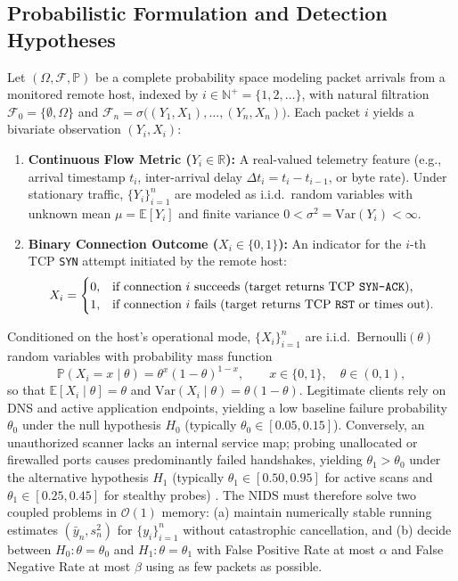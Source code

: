 \documentclass[oneside,noexaminfo,english]{sapthesis}
\numberwithin{equation}{section}
\numberwithin{figure}{section}
\numberwithin{table}{section}
\theoremstyle{compactplain}
\theoremstyle{compactdef}
\theoremstyle{compactrem}
\newcommand{\E}{\mathbb{E}}
\newcommand{\Prob}{\mathbb{P}}
\newcommand{\Var}{\mathrm{Var}}
\newcommand{\R}{\mathbb{R}}
\newcommand{\N}{\mathbb{N}}
\begin{document}
\subsection{Probabilistic Formulation and Detection Hypotheses}
Let $(\Omega, \mathcal{F}, \Prob)$ be a complete probability space modeling packet arrivals from a monitored remote host, indexed by $i \in \N^+ = \{1, 2, \dots\}$, with natural filtration $\mathcal{F}_0 = \{\emptyset, \Omega\}$ and $\mathcal{F}_n = \sigma\bigl((Y_1, X_1), \dots, (Y_n, X_n)\bigr)$. Each packet $i$ yields a bivariate observation $(Y_i, X_i)$:
\begin{enumerate}
    \item \textbf{Continuous Flow Metric ($Y_i \in \R$):} A real-valued telemetry feature (e.g., arrival timestamp $t_i$, inter-arrival delay $\Delta t_i = t_i - t_{i-1}$, or byte rate). Under stationary traffic, $\{Y_i\}_{i=1}^n$ are modeled as i.i.d.\ random variables with unknown mean $\mu = \E[Y_i]$ and finite variance $0 < \sigma^2 = \Var(Y_i) < \infty$.
    \item \textbf{Binary Connection Outcome ($X_i \in \{0, 1\}$):} An indicator for the $i$-th TCP \texttt{SYN} attempt initiated by the remote host:
    \begin{equation}
        \label{eq:bernoulli_def}
        X_i = \begin{cases}
            0, & \text{if connection } i \text{ succeeds (target returns TCP \texttt{SYN-ACK}),} \\
            1, & \text{if connection } i \text{ fails (target returns TCP \texttt{RST} or times out).}
        \end{cases}
    \end{equation}
\end{enumerate}
Conditioned on the host's operational mode, $\{X_i\}_{i=1}^n$ are i.i.d.\ $\mathrm{Bernoulli}(\theta)$ random variables with probability mass function
\begin{equation}
    \label{eq:bernoulli_pmf}
    \Prob(X_i = x \mid \theta) = \theta^x (1 - \theta)^{1-x}, \qquad x \in \{0, 1\}, \quad \theta \in (0, 1),
\end{equation}
so that $\E[X_i \mid \theta] = \theta$ and $\Var(X_i \mid \theta) = \theta(1 - \theta)$. Legitimate clients rely on DNS and active application endpoints, yielding a low baseline failure probability $\theta_0$ under the null hypothesis $H_0$ (typically $\theta_0 \in [0.05, 0.15]$). Conversely, an unauthorized scanner lacks an internal service map; probing unallocated or firewalled ports causes predominantly failed handshakes, yielding $\theta_1 > \theta_0$ under the alternative hypothesis $H_1$ (typically $\theta_1 \in [0.50, 0.95]$ for active scans and $\theta_1 \in [0.25, 0.45]$ for stealthy probes) \cite{jung2004}. The NIDS must therefore solve two coupled problems in $\mathcal{O}(1)$ memory: (a) maintain numerically stable running estimates $(\bar{y}_n, s_n^2)$ for $\{y_i\}_{i=1}^n$ without catastrophic cancellation, and (b) decide between $H_0: \theta = \theta_0$ and $H_1: \theta = \theta_1$ with False Positive Rate at most $\alpha$ and False Negative Rate at most $\beta$ using as few packets as possible.
\end{document}
